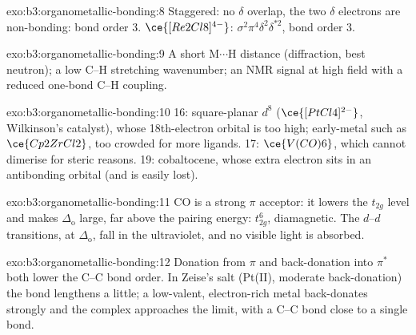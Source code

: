 \begin{solution}{exo:b3:organometallic-bonding:8}
Staggered: no $\delta$ overlap, the two $\delta$ electrons are non-bonding: bond order 3. $\ce{[Re2Cl8]^{4-}}$:
$\sigma^2\pi^4\delta^2\delta^{\ast2}$, bond order 3.
\end{solution}

\begin{solution}{exo:b3:organometallic-bonding:9}
A short M$\cdots$H distance (diffraction, best neutron); a low C--H stretching
wavenumber; an NMR signal at high field with a reduced one-bond C--H coupling.
\end{solution}

\begin{solution}{exo:b3:organometallic-bonding:10}
16: square-planar $d^8$ ($\ce{[PtCl4]^{2-}}$, Wilkinson's catalyst), whose 18th-electron orbital
is too high; early-metal  such as $\ce{Cp2ZrCl2}$, too crowded for more
ligands. 17: $\ce{V(CO)6}$, which cannot dimerise for steric reasons. 19: cobaltocene,
whose extra electron sits in an antibonding orbital (and is easily lost).
\end{solution}

\begin{solution}{exo:b3:organometallic-bonding:11}
CO is a strong $\pi$ acceptor: it lowers the $t_{2g}$ level and makes $\Delta_{\mathrm o}$ large, far above the
pairing energy: $t_{2g}^6$, diamagnetic. The $d$--$d$ transitions, at $\Delta_{\mathrm o}$, fall in the ultraviolet,
and no visible light is absorbed.
\end{solution}

\begin{solution}{exo:b3:organometallic-bonding:12}
Donation from $\pi$ and back-donation into $\pi^*$ both lower the C--C bond order. In Zeise's
salt (Pt(II), moderate back-donation) the bond lengthens a little; a low-valent,
electron-rich metal back-donates strongly and the complex approaches the
 limit, with a C--C bond close to a single bond.
\end{solution}

